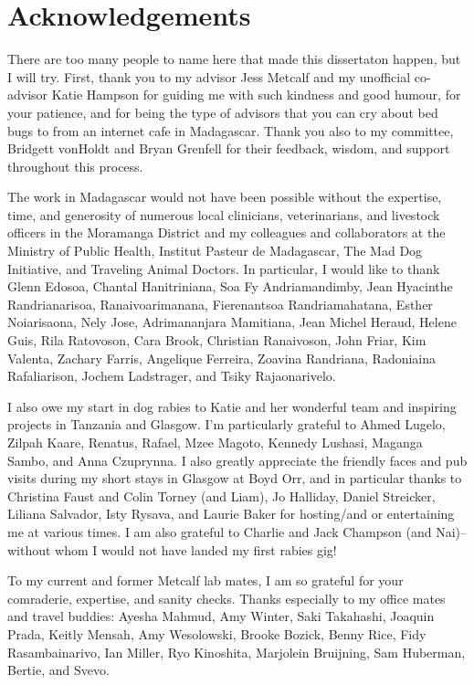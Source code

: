 \documentclass[
  oneside]{book}
\begin{document}
\newpage

\section*{Acknowledgements}

There are too many people to name here that made this dissertaton happen, but I will try. First, thank you to my advisor Jess Metcalf and my unofficial co-advisor Katie Hampson for guiding me with such kindness and good humour, for your patience, and for being the type of advisors that you can cry about bed bugs to from an internet cafe in Madagascar. Thank you also to my committee, Bridgett vonHoldt and Bryan Grenfell for their feedback, wisdom, and support throughout this process. 

The work in Madagascar would not have been possible without the expertise, time, and generosity of numerous local clinicians, veterinarians, and livestock officers in the Moramanga District and my colleagues and collaborators at the Ministry of Public Health, Institut Pasteur de Madagascar, The Mad Dog Initiative, and Traveling Animal Doctors. In particular, I would like to thank Glenn Edosoa, Chantal Hanitriniana, Soa Fy Andriamandimby, Jean Hyacinthe Randrianarisoa, Ranaivoarimanana, Fierenantsoa Randriamahatana, Esther Noiarisaona, Nely Jose, Adrimananjara Mamitiana, Jean Michel Heraud, Helene Guis, Rila Ratovoson, Cara Brook, Christian Ranaivoson, John Friar, Kim Valenta, Zachary Farris, Angelique Ferreira, Zoavina Randriana, Radoniaina Rafaliarison, Jochem Ladstrager, and Tsiky Rajaonarivelo.

I also owe my start in dog rabies to Katie and her wonderful team and inspiring projects in Tanzania and Glasgow. I'm particularly grateful to Ahmed Lugelo, Zilpah Kaare, Renatus, Rafael, Mzee Magoto, Kennedy Lushasi, Maganga Sambo, and Anna Czuprynna. I also greatly appreciate the friendly faces and pub visits during my short stays in Glasgow at Boyd Orr, and in particular thanks to Christina Faust and Colin Torney (and Liam), Jo Halliday, Daniel Streicker, Liliana Salvador, Isty Rysava, and Laurie Baker for hosting/and or entertaining me at various times. I am also grateful to Charlie and Jack Champson (and Nai)-- without whom I would not have landed my first rabies gig! 

To my current and former Metcalf lab mates, I am so grateful for your comraderie, expertise, and sanity checks. Thanks especially to my office mates and travel buddies: Ayesha Mahmud, Amy Winter, Saki Takahashi, Joaquin Prada, Keitly Mensah, Amy Wesolowski, Brooke Bozick, Benny Rice, Fidy Rasambainarivo, Ian Miller, Ryo Kinoshita, Marjolein Bruijning, Sam Huberman, Bertie, and Svevo. 
\end{document}
